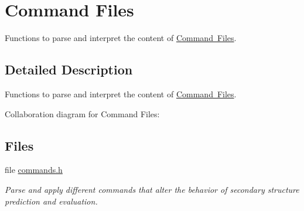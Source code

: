 \hypertarget{group__command__files}{}\section{Command Files}
\label{group__command__files}


Functions to parse and interpret the content of \mbox{\hyperlink{file_formats_constraint-formats-file}{Command Files}}.  




\subsection{Detailed Description}
Functions to parse and interpret the content of \mbox{\hyperlink{file_formats_constraint-formats-file}{Command Files}}. 

Collaboration diagram for Command Files\+:
\subsection*{Files}
\begin{DoxyCompactItemize}
\item 
file \mbox{\hyperlink{commands_8h}{commands.\+h}}
\begin{DoxyCompactList}\small\item\em Parse and apply different commands that alter the behavior of secondary structure prediction and evaluation. \end{DoxyCompactList}\end{DoxyCompactItemize}
